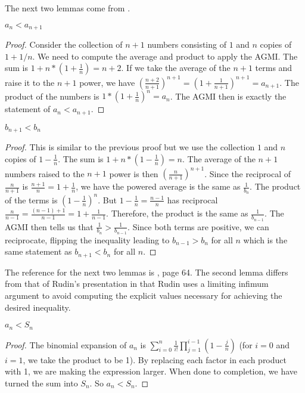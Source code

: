 \documentclass[12pt]{article}
\begin{document}
The next two lemmas come from \cite{mend}.

\begin{lemma}
  $ a_n < a_{n+1}$ 
\end{lemma}

\begin{proof}
Consider the collection of $n+1$ numbers consisting of $1$ and $n$ copies of $1+1/n$. We need to compute the average and product to apply the AGMI. The sum is $1 + n* (1 + \frac{1}{n} ) = n+2$. If we take the average of the $n+1$ terms and raise it to the $n+1$ power, we have $(\frac{n+2}{n+1})^{n+1} = (1 + \frac{1}{n+1})^{n+1} = a_{n+1}$. The product of the numbers is $1*(1+\frac{1}{n})^n = a_n$. The AGMI then is exactly the statement of $a_n < a_{n+1}$.
\end{proof}

\begin{lemma}
 $b_{n+1} < b_n$
\end{lemma}

\begin{proof}
This is similar to the previous proof but we use the collection $1$ and $n$ copies of $1 - \frac{1}{n}$. The sum is $1 + n*(1-\frac{1}{n}) = n$. The average of the $n+1$ numbers raised to the $n+1$ power is then $(\frac{n}{n+1})^{n+1}$. Since the reciprocal of $\frac{n}{n+1}$ is $\frac{n+1}{n} = 1+\frac{1}{n}$, we have the powered average is the same as $\frac{1}{b_n}$. The product of the terms is $(1-\frac{1}{n})^n$. But $1 - \frac{1}{n} = \frac{n-1}{n}$ has reciprocal $\frac{n}{n-1} = \frac{ (n-1) + 1}{n-1} = 1 + \frac{1}{n-1}$. Therefore, the product is the same as $\frac{1}{b_{n-1}}$. The AGMI then tells us that $\frac{1}{b_n} > \frac{1}{b_{n-1}}$. Since both terms are positive, we can reciprocate, flipping the inequality leading to $b_{n-1} > b_n$ for all $n$ which is the same statement as $b_{n+1} < b_n$ for all $n$. 
\end{proof}

The reference for the next two lemmas is \cite{rudin}, page 64. The second lemma differs from that of Rudin's presentation in that Rudin uses a limiting infimum argument to avoid computing the explicit values necessary for achieving the desired inequality. 

\begin{lemma}\label{lem:ansn}
$a_n < S_n$
\end{lemma}

\begin{proof}
The binomial expansion of $a_n$ is $\sum_{i=0}^n \frac{1}{i!} \prod_{j=1}^{i-1} (1-\tfrac{j}{n})$ (for $i=0$ and $i=1$, we take the product to be 1). By replacing each factor in each product with 1, we are making the expression larger. When done to completion, we have turned the sum into $S_n$. So $a_n < S_n$.
\end{proof}
\end{document}
